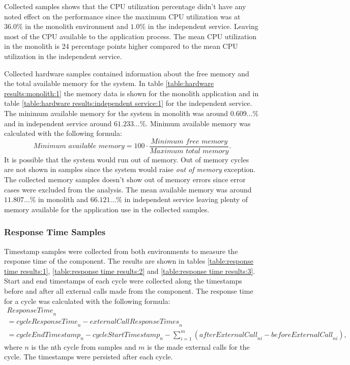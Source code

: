 Collected samples shows that the CPU utilization percentage didn't have any noted effect on the performance since the maximum CPU utilization was at $36.0\%$ in the monolith environment and $1.0\%$ in the independent service.
Leaving most of the CPU available to the application process.
The mean CPU utilization in the monolith is 24 percentage points higher compared to the mean CPU utilization in the independent service.

Collected hardware samples contained information about the free memory and the total available memory for the system.
In table \ref{table:hardware results:monolith:1} the memory data is shown for the monolith application and in table \ref{table:hardware results:independent service:1} for the independent service.
The minimum available memory for the system in monolith was around $0.609...\%$ and in independent service around $61.233...\%$.
Minimum available memory was calculated with the following formula:
\[
\textit{Minimum available memory} = 100 \cdot \frac{\textit{Minimum free memory}}{\textit{Maximum total memory}}
.\]
It is possible that the system would run out of memory.
Out of memory cycles are not shown in samples since the system would raise \textit{out of memory} exception.
The collected memory samples doesn't show out of memory errors since error cases were excluded from the analysis.
The mean available memory was around $11.807...\%$ in monolith and $66.121...\%$ in independent service leaving plenty of memory available for the application use in the collected samples.

\subsubsection{Response Time Samples}
Timestamp samples were collected from both environments to measure the response time of the component.
The results are shown in tables \ref{table:response time results:1}, \ref{table:response time results:2} and \ref{table:response time results:3}.
Start and end timestamps of each cycle were collected along the timestamps before and after all external calls made from the component.
The response time for a cycle was calculated with the following formula:
\begin{gather*}
\textit{ResponseTime}_n
\\ =\textit{cycleResponseTime}_n - \textit{externalCallResponseTimes}_n
\\ = \textit{cycleEndTimestamp}_n - \textit{cycleStartTimestamp}_n - 
    \sum_{i=1}^{\textit{m}} (\textit{afterExternalCall}_{ni} -     \textit{beforeExternalCall}_{ni}),
\end{gather*}
where $n$ is the nth cycle from samples and $m$ is the made external calls for the cycle.
The timestamps were persisted after each cycle.

